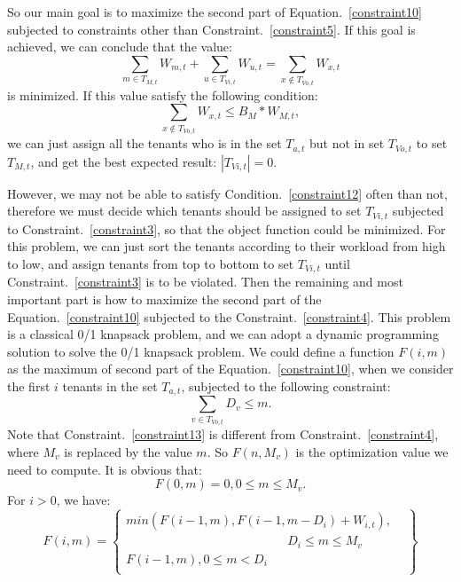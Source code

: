 So our main goal is to maximize the second part of Equation.~\ref{constraint10} subjected to constraints other than Constraint.~\ref{constraint5}. If this goal is achieved, we can conclude that the value:
\begin{equation}\label{constraint11}
    \sum_{m \in T_{M, t}}{W_{m, t}} +\sum_{u \in T_{Vi, t}}{W_{u, t}}=\sum_{x \notin T_{Vo,t}}{W_{x,t}}
\end{equation}
is minimized. If this value satisfy the following condition:
\begin{equation}\label{constraint12}
    \sum_{x \notin T_{Vo, t}}{W_{x, t}} \leq B_M * W_{M, t},
\end{equation}
we can just assign all the tenants who is in the set $T_{a,t}$ but not in set $T_{Vo,t}$ to set $T_{M,t}$, and get the best expected result: $|T_{Vi,t}|=0$.

However, we may not be able to satisfy Condition.~\ref{constraint12} often than not, therefore we must decide which tenants should be assigned to set $T_{Vi,t}$ subjected to Constraint.~\ref{constraint3}, so that the object function could be minimized. For this problem, we can just sort the tenants according to their workload from high to low, and assign tenants from top to bottom to set $T_{Vi,t}$ until Constraint.~\ref{constraint3} is to be violated. Then the remaining and most important part is how to maximize the second part of the Equation.~\ref{constraint10} subjected to the Constraint.~\ref{constraint4}. This problem is a classical 0/1 knapsack problem, and we can adopt a dynamic programming solution to solve the 0/1 knapsack problem. We could define a function $F(i,m)$ as the maximum of second part of the Equation.~\ref{constraint10}, when we consider the first $i$ tenants in the set $T_{a,t}$, subjected to the following constraint:
\begin{equation}\label{constraint13}
    \sum_{v \in T_{Vo, t}}{D_{v}}\leq m.
\end{equation}
Note that Constraint.~\ref{constraint13} is different from Constraint.~\ref{constraint4}, where $M_v$ is replaced by the value $m$. So $F(n,M_v)$ is the optimization value we need to compute.
It is obvious that:
\begin{equation}\label{constraint14}
    F(0,m)=0,0\leq m\leq M_v.
\end{equation}
For $i>0$, we have:
\begin{equation}
 F(i,m)=\left\{
 \begin{array}{lr}
 min(F(i-1,m),F(i-1,m-D_{i})+W_{i,t}), &   \\
 \qquad \qquad \qquad \qquad \qquad \qquad \quad D_{i}\leq m\leq M_v &  \\
 F(i-1,m), 0\leq m< D_{i} \\
 \end{array}\right\}
 \end{equation}

